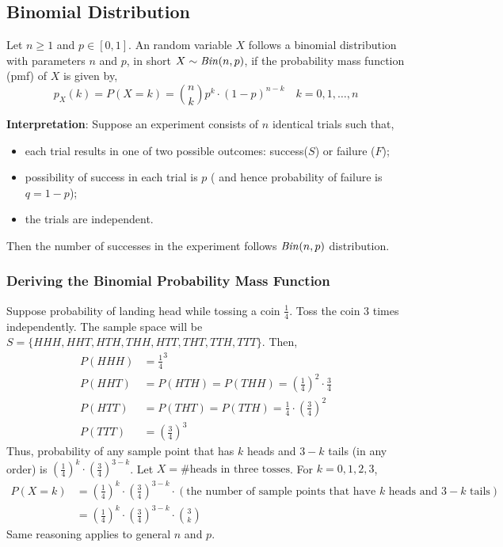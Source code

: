 \subsection{Binomial Distribution}
\begin{definition}
    Let $n \geq 1$ and $p \in [0, 1]$. An random variable $X$ follows a
binomial distribution with parameters $n$ and $p$, in short $X \sim
\text{\emph{Bin}}(n, p)$, if the probability mass function (pmf) of $X$ is given
by,
    \begin{equation*}
        p_X(k) = P(X = k) = {n \choose k}p^k \cdot (1-p)^{n-k}
        \quad
        k = 0, 1, \dots, n
    \end{equation*}
\end{definition}
\noindent
\textbf{Interpretation}: Suppose an experiment consists of $n$ identical trials
such that, 
\begin{itemize}[noitemsep, topsep=0em]
\item
    each trial results in one of two possible outcomes: success($S$) or failure
    ($F$);
\item
    possibility of success in each trial is $p$ ( and hence probability of
    failure is $q = 1 - p$);
\item
    the trials are independent.
\end{itemize}
Then the number of successes in the experiment follows $\text{\emph{Bin}}(n, p)$
distribution.

\subsubsection*{Deriving the Binomial Probability Mass Function}
Suppose probability of landing head while tossing a coin $\frac{1}{4}$. Toss
the coin $3$ times independently. The sample space will be $S = \lbrace HHH,
HHT, HTH, THH, HTT, THT, TTH, TTT \rbrace$. Then, 
\begin{align*}
    P(HHH) &= \frac{1}{4}^3                                                  \\
    P(HHT) &= P(HTH) = P(THH) = (\frac{1}{4})^2 \cdot \frac{3}{4}            \\
    P(HTT) &= P(THT) = P(TTH) = \frac{1}{4} \cdot (\frac{3}{4})^2            \\
    P(TTT) &= (\frac{3}{4})^3
\end{align*}
Thus, probability of any sample point that has $k$ heads and $3-k$ tails (in
any order) is $(\frac{1}{4})^k \cdot (\frac{3}{4})^{3-k}$. Let $X =
\#\text{heads in three tosses}$. For $k = 0, 1, 2, 3$, 
\begin{align*}
    P(X = k) &= (\frac{1}{4})^k \cdot (\frac{3}{4})^{3 - k} \cdot
                (\text{the number of sample points that have $k$ heads and
                $3-k$ tails})                                                \\
             &= (\frac{1}{4})^k \cdot (\frac{3}{4})^{3 - k} \cdot
                {3 \choose k}
\end{align*}
Same reasoning applies to general $n$ and $p$.

